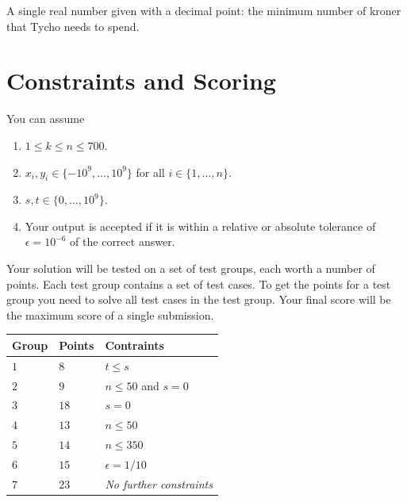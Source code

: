 A single real number given with a decimal point: the minimum number of kroner that Tycho needs to spend.

\section*{Constraints and Scoring}

You can assume 
\begin{enumerate}
\item $1\leq k\leq n\leq 700$. %
\item $x_i, y_i\in \{-10^9,\ldots, 10^9\}$ for all $i\in\{1,\ldots,n\}$. %
\item $s,t\in \{0,\ldots, 10^9\}$. %
\item Your output is accepted if it is within a relative or absolute tolerance of $\epsilon = 10^{-6}$ of the correct answer.
\end{enumerate}


Your solution will be tested on a set of test groups, each worth a number of points.
Each test group contains a set of test cases.
To get the points for a test group you need to solve all test cases in the test group.
Your final score will be the maximum score of a single submission.

\medskip
\noindent
\begin{tabular}{lll}
  Group & Points & Contraints\\\hline
  $1$ & $8$ &  $t\leq s$\\
  $2$ & $9$ & $n\le 50$ and $s=0$\\
  $3$ & $18$ & $s=0$\\
  $4$ & $13$ & $n\leq 50$\\
  $5$ & $14$ & $n\leq 350$\\
  $6$ & $15$ & $\epsilon = 1/10$\\
  $7$ & $23$ & \emph{No further constraints}\\
\end{tabular}
